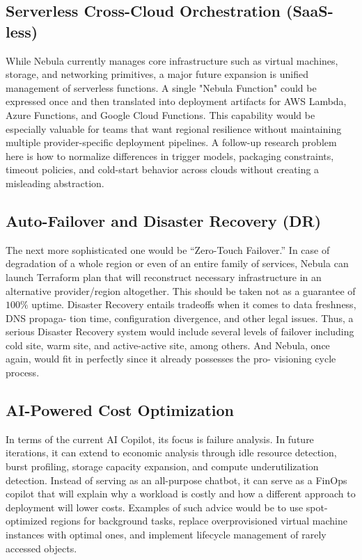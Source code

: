 \subsection{Serverless Cross-Cloud Orchestration (SaaS-less)}
While Nebula currently manages core infrastructure such as virtual machines, storage, and networking primitives, a major future expansion is unified management of serverless functions. A single "Nebula Function" could be expressed once and then translated into deployment artifacts for AWS Lambda, Azure Functions, and Google Cloud Functions. This capability would be especially valuable for teams that want regional resilience without maintaining multiple provider-specific deployment pipelines. A follow-up research problem here is how to normalize differences in trigger models, packaging constraints, timeout policies, and cold-start behavior across clouds without creating a misleading abstraction.

\subsection{Auto-Failover and Disaster Recovery (DR)}
The next more sophisticated one would be “Zero-Touch Failover.” In case of degradation of a whole region or even of an entire family of services, Nebula can launch Terraform plan that will reconstruct necessary infrastructure in an alternative provider/region altogether. This should be taken not as a guarantee of \(100\%\) uptime. Disaster Recovery entails tradeoffs when it comes to data freshness, DNS propaga- tion time, configuration divergence, and other legal issues. Thus, a serious Disaster Recovery system would include several levels of failover including cold site, warm site, and active-active site, among others. And Nebula, once again, would fit in perfectly since it already possesses the pro- visioning cycle process.

\subsection{AI-Powered Cost Optimization}
In terms of the current AI Copilot, its focus is failure analysis. In future iterations, it can extend to economic analysis through idle resource detection, burst profiling, storage capacity expansion, and compute underutilization detection. Instead of serving as an all-purpose chatbot, it can serve as a FinOps copilot that will explain why a workload is costly and how a different approach to deployment will lower costs. Examples of such advice would be to use spot-optimized regions for background tasks, replace overprovisioned virtual machine instances with optimal ones, and implement lifecycle management of rarely accessed objects.

